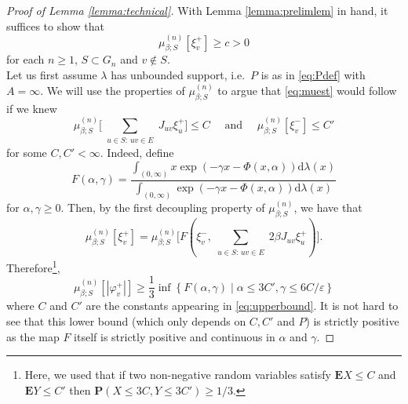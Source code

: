 \documentclass{article}
\numberwithin{equation}{section}
\theoremstyle{definition}
\theoremstyle{definition}
\theoremstyle{remark}
\renewcommand{\d}{\mathrm{d}}
\newcommand{\E}{\mathbb{E}}
\newcommand\vp{\varphi}
\renewcommand{\d}{\mathrm{d}}
\renewcommand{\l}{\lambda}
\newcommand{\vpp}{\vp^+}
\newcommand{\I}{\Phi}
\renewcommand{\P}{\mathrm{\mathbf{P}}}
\renewcommand{\E}{\mathrm{\mathbf{E}}}
\renewcommand{\L}{\xi}
\newcommand{\eps}{\varepsilon}
\begin{document}
\begin{proof}[Proof of Lemma \ref{lemma:technical}]
	With Lemma \ref{lemma:prelimlem} in hand, it suffices to show that
	\begin{equation}\label{eq:muest}
		\mu_{\beta;S}^{(n)}\left[ \L^+_v  \right]  \geq c > 0
	\end{equation} 
	for each $n \geq 1$, $S \subset G_n$ and $v \not\in  S$.
	\\[1em]
	\noindent Let us first assume $\l$ has unbounded support, i.e.~$P$ is as in \eqref{eq:Pdef} with $A = \infty$. We will use the properties of $\mu_{\beta;S}^{(n)}$ to argue that \eqref{eq:muest} would follow if we knew  
	\begin{equation}\label{eq:upperbound}
		\mu_{\beta;S}^{(n)}\Bigg[ \sum_{\substack{u \in S : \,uv \in E}} J_{uv} \L^+_u \Bigg] \leq C \quad\text{ and }\quad \mu_{\beta;S}^{(n)}\left[ \L^-_v \right] \leq C'
	\end{equation} 
	for some $C,C' < \infty$. 
	Indeed, define
	\[
		F(\alpha,\gamma) = \frac{\int_{(0,\infty)} x \exp( - \gamma x - \I(x,\alpha)) \d\l(x)}{\int_{(0,\infty)} \exp( -\gamma x - \I(x,\alpha)) \d\l(x)}
	\] 
	for $\alpha,\gamma \geq 0$. Then, by the first decoupling property of $\mu_{\beta;S}^{(n)}$, we have that
	\[
		\mu_{\beta;S}^{(n)}\left[ \L^+_v \right] = \mu_{\beta;S}^{(n)}\Big[ F(\L^-_v,\sum_{\substack{u \in S : \,uv \in E}} 2\beta J_{uv} \L^+_u) \Big]. 
	\] 
	Therefore{\hypersetup{linkcolor=black}\footnote{Here, we used that if two non-negative random variables satisfy $\E X \leq C$ and $\E Y \leq C'$ then $\P(X \leq 3C, Y \leq 3C') \geq 1 / 3$. }},
	\[
		\mu^{(n)}_{\beta;S}\left[ |\vpp_v| \right] \geq \frac{1}{3} \inf \left\{ F(\alpha,\gamma) \mid \alpha \leq 3C', \gamma \leq {6C} / \eps  \right\}
	\] 
	where $C$ and $C'$ are the constants appearing in \eqref{eq:upperbound}. It is not hard to see that this lower bound (which only depends on $C,C'$ and $P$) is strictly positive as the map $F$ itself is strictly positive and continuous in $\alpha$ and $\gamma$.


\end{proof}
\end{document}
